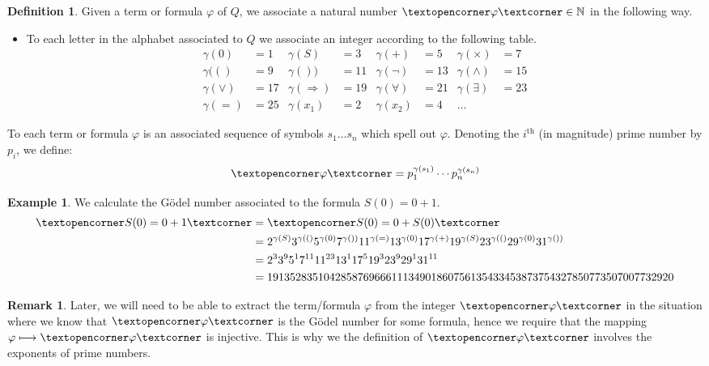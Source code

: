 \documentclass[12pt]{article}
\theoremstyle{plain}
\theoremstyle{definition}
\newtheorem{defn}[thm]{Definition} %
\newtheorem{remark}[thm]{Remark}
\newtheorem{example}[thm]{Example}
\newcommand{\bb}[1]{\mathbb{#1}}
\newcommand{\adj}[1]{\text{\textopencorner}{#1}\text{\textcorner}}
\begin{document}
	\begin{defn}
		Given a term or formula $\varphi$ of $Q$, we associate a natural number $\adj{\varphi} \in \bb{N}$ in the following way.
		\begin{itemize}
			\item To each letter in the alphabet associated to $Q$ we associate an integer according to the following table.
			\begin{align*}
				\gamma(0) &= 1 & \gamma(S) &= 3 & \gamma(+) &= 5 & \gamma(\times) &= 7\\
				\gamma(() &= 9 & \gamma()) &= 11 & \gamma(\neg) &= 13 & \gamma(\wedge) &= 15\\
				\gamma(\vee) &= 17 & \gamma(\Longrightarrow) &= 19 & \gamma(\forall) &= 21 & \gamma(\exists) &= 23\\
				\gamma(=) &= 25 & \gamma(x_1) &= 2 & \gamma(x_2) &= 4 & \hdots
			\end{align*}
		\end{itemize}
		\item To each term or formula $\varphi$ is an associated sequence of symbols $s_1\hdots s_n$ which spell out $\varphi$. Denoting the $i^\text{th}$ (in magnitude) prime number by $p_i$, we define:
		\begin{equation}
			\adj{\varphi} = p_1^{\gamma(s_1)}\cdots p_n^{\gamma(s_n)}
		\end{equation}
	\end{defn}
	\begin{example}
		We calculate the G\"{o}del number associated to the formula $S(0)=0+1$.
		\begin{align*}
			\adj{S(0)=0+1} &= \adj{S(0)=0+S(0)}\\
			&= 2^{\gamma(S)}3^{\gamma(()}5^{\gamma(0)}7^{\gamma())}11^{\gamma(=)}13^{\gamma(0)}17^{\gamma(+)}19^{\gamma(S)}23^{\gamma(()}29^{\gamma(0)}31^{\gamma())}\\
			&= 2^3 3^9 5^1 7^{11} 11^{23} 13^1 17^5 19^3 23^9 29^1 31^{11}\\
			&= 191352835104285876966611134901860756135433453873754327850773507007732920
		\end{align*}
	\end{example}
	\begin{remark}
		Later, we will need to be able to extract the term/formula $\varphi$ from the integer $\adj{\varphi}$ in the situation where we know that $\adj{\varphi}$ is the G\"{o}del number for some formula, hence we require that the mapping $\varphi \longmapsto \adj{\varphi}$ is injective. This is why we the definition of $\adj{\varphi}$ involves the exponents of prime numbers.
	\end{remark}
	
\end{document}
